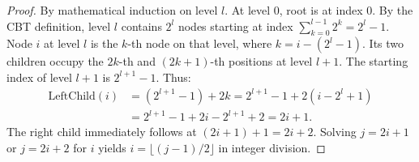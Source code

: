\documentclass[10pt,twocolumn,letterpaper]{article}
\begin{document}
\begin{proof}
By mathematical induction on level $l$. At level $0$, root is at index $0$. By the CBT definition, level $l$ contains $2^l$ nodes starting at index $\sum_{k=0}^{l-1} 2^k = 2^l - 1$. Node $i$ at level $l$ is the $k$-th node on that level, where $k = i - (2^l - 1)$. Its two children occupy the $2k$-th and $(2k+1)$-th positions at level $l+1$. The starting index of level $l+1$ is $2^{l+1}-1$. Thus:
\begin{align*}
\text{LeftChild}(i) &= (2^{l+1} - 1) + 2k = 2^{l+1} - 1 + 2(i - 2^l + 1) \\
&= 2^{l+1} - 1 + 2i - 2^{l+1} + 2 = 2i + 1.
\end{align*}
The right child immediately follows at $(2i + 1) + 1 = 2i + 2$. Solving $j = 2i + 1$ or $j = 2i + 2$ for $i$ yields $i = \lfloor (j-1)/2 \rfloor$ in integer division.
\end{proof}
\end{document}
